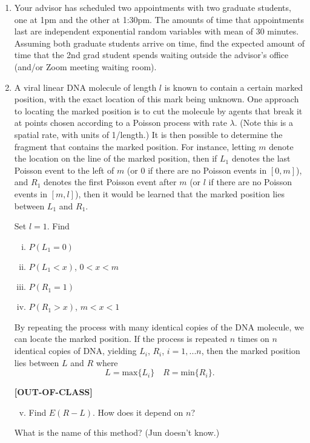 \documentclass[12pt,letterpaper]{article}
\begin{document}
\begin{enumerate}


\item Your advisor has scheduled two appointments with two graduate students, one at 1pm and the other at 1:30pm. The amounts of time that appointments last are independent exponential random variables with mean of 30 minutes. Assuming both graduate students arrive on time, find the expected amount of time that the 2nd grad student spends waiting outside the advisor's office (and/or Zoom meeting waiting room).


\item A viral linear DNA molecule of length $l$ is known to contain a certain marked position, with the exact location of this mark being unknown. One approach to locating the marked position is to cut the molecule by agents that break it at points chosen according to a Poisson process with rate $\lambda$. (Note this is a spatial rate, with units of 1/length.) It is then possible to determine the fragment that contains the marked position. For instance, letting $m$ denote the location on the line of the marked position, then if $L_1$ denotes the last Poisson event to the left of $m$ (or $0$ if there are no Poisson events in $[0,m]$), and $R_1$ denotes the first Poisson event after $m$ (or $l$ if there are no Poisson events in $[m,l]$), then it would be learned that the marked position lies between $L_1$ and $R_1$.

Set $l=1$. Find
\begin{enumerate}[i.]
\item $P(L_1=0)$
\item $P(L_1<x)$, $0<x<m$
\item $P(R_1=1)$
\item $P(R_1> x)$, $m<x<1$
\end{enumerate}
By repeating the process with many identical copies of the DNA molecule, we can locate the marked position. If the process is repeated $n$ times on $n$ identical copies of DNA, yielding $L_i$, $R_i$, $i=1,...n$, then the marked position lies between $L$ and $R$ where
\begin{equation}
L = \mbox{max}\{L_i\} \quad R = \mbox{min}\{R_i\}.
\end{equation}

\textbf{[OUT-OF-CLASS]}
\begin{enumerate}[i.]
  \setcounter{enumii}{4}
\item Find $E(R-L)$. How does it depend on $n$?
\end{enumerate}
What is the name of this method? (Jun doesn't know.)




\end{enumerate}
\end{document}
